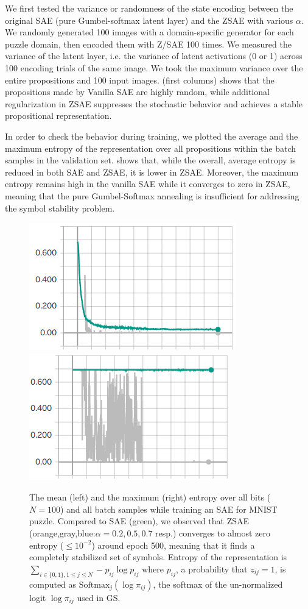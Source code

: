 We first tested the variance or randomness of the state encoding between
the original SAE (pure Gumbel-softmax latent layer) and the ZSAE with various $\alpha$.
We randomly generated 100 images with a domain-specific generator for each puzzle domain,
then encoded them with Z/SAE 100 times.
We measured the variance of the latent layer, i.e. the variance of latent activations (0 or 1)
across 100 encoding trials of the same image.
We took the maximum variance over the entire propositions and 100 input images.
 (first columns) shows that the propositions made by Vanilla SAE are highly random,
while additional regularization in ZSAE suppresses the stochastic behavior
and achieves a stable propositional representation.

In order to check the behavior during training, 
we plotted the average and the maximum entropy of the representation over all propositions
within the batch samples in the validation set.
% 
 shows that, while the overall, average entropy is reduced in both SAE and ZSAE,
it is lower in ZSAE. 
Moreover,
the maximum entropy remains high in the vanilla SAE while it converges to zero in ZSAE, meaning that
the pure Gumbel-Softmax annealing is insufficient for addressing the symbol stability problem.

\begin{figure}[htbp]
\centering
 \includegraphics[width=0.49\linewidth]{img/static/val-mean-entropy.png}
 \includegraphics[width=0.49\linewidth]{img/static/val-max-entropy.png}
 \caption{
The mean (left) and the maximum (right) entropy over all bits ($N=100$) and all batch samples
while training an SAE for MNIST puzzle.
Compared to SAE (green), we observed that ZSAE (orange,gray,blue:$\alpha=0.2,0.5,0.7$ resp.) converges to
almost zero entropy ($\leq 10^{-2}$) around epoch 500, meaning that it finds a completely
stabilized set of symbols.
% 
Entropy of the representation is $\sum_{i\in\{0,1\},1\leq j \leq N} -p_{ij}\log p_{ij}$ where
$p_{ij}$, a probability that $z_{ij}=1$, is computed as $\text{Softmax}_j(\log \pi_{ij})$,
the softmax of the un-normalized logit $\log \pi_{ij}$ used in GS.}
\label{ZSAE-entropy}
\end{figure}


